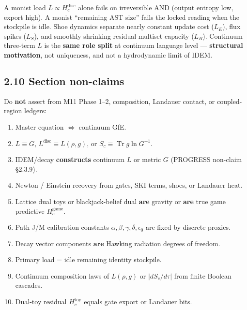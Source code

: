\documentclass[
  11pt,
]{article}
\providecommand{\tightlist}{%
  \setlength{\itemsep}{0pt}\setlength{\parskip}{0pt}}
\begin{document}
A monist load \(L\propto H_c^{\mathrm{disc}}\) alone fails on
irreversible AND (output entropy low, export high). A monist ``remaining
AST size'' fails the locked reading when the stockpile is idle. Shoe
dynamics separate nearly constant update cost (\(L_E\)), flux spikes
(\(L_S\)), and smoothly shrinking residual multiset capacity (\(L_B\)).
Continuum three-term \(L\) is the \textbf{same role split} at continuum
language level --- \textbf{structural motivation}, not uniqueness, and
not a hydrodynamic limit of IDEM.

\subsection{2.10 Section non-claims}\label{section-non-claims}

Do \textbf{not} assert from M11 Phase 1--2, composition, Landauer
contact, or coupled-region ledgers:

\begin{enumerate}
\def\labelenumi{\arabic{enumi}.}
\tightlist
\item
  Master equation \(\Leftrightarrow\) continuum GfE.\\
\item
  \(L\equiv G\), \(L^{\mathrm{disc}}\equiv L(\rho,g)\), or
  \(S_c\equiv\operatorname{Tr} g\ln G^{-1}\).\\
\item
  IDEM/decay \textbf{constructs} continuum \(L\) or metric \(G\)
  (PROGRESS non-claim §2.3.9).\\
\item
  Newton / Einstein recovery from gates, SKI terms, shoes, or Landauer
  heat.\\
\item
  Lattice dual toys or blackjack-belief dual \textbf{are} gravity or
  \textbf{are} true game predictive \(H_c^{\mathrm{game}}\).\\
\item
  Path J/M calibration constants
  \(\alpha,\beta,\gamma,\delta,\epsilon_0\) are fixed by discrete
  proxies.\\
\item
  Decay vector components \textbf{are} Hawking radiation degrees of
  freedom.\\
\item
  Primary load = idle remaining identity stockpile.\\
\item
  Continuum composition laws of \(L(\rho,g)\) or
  \(\lvert dS_c/d\tau\rvert\) from finite Boolean cascades.\\
\item
  Dual-toy residual \(H_c^{\mathrm{toy}}\) equals gate export or
  Landauer bits.
\end{enumerate}
\end{document}

